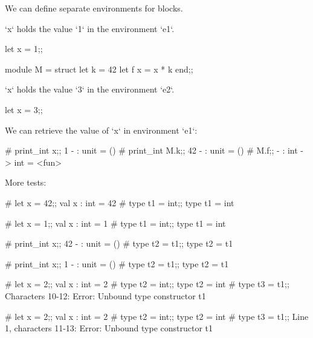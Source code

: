We can define separate environments for blocks.

`x` holds the value `1` in the environment `e1`.

\begin{ocaml}
let x = 1;;
\end{ocaml}

\begin{ocaml}
module M = struct let k = 42 let f x = x * k end;;
\end{ocaml}

`x` holds the value `3` in the environment `e2`.

\begin{ocaml}
let x = 3;;
\end{ocaml}

We can retrieve the value of `x` in environment `e1`:

\begin{ocaml}
# print_int x;;
1
- : unit = ()
# print_int M.k;;
42
- : unit = ()
# M.f;;
- : int -> int = <fun>
\end{ocaml}

More tests:
\begin{ocaml}
# let x = 42;;
val x : int = 42
# type t1 = int;;
type t1 = int
\end{ocaml}

\begin{ocaml}
# let x = 1;;
val x : int = 1
# type t1 = int;;
type t1 = int
\end{ocaml}

\begin{ocaml}
# print_int x;;
42
- : unit = ()
# type t2 = t1;;
type t2 = t1
\end{ocaml}

\begin{ocaml}
# print_int x;;
1
- : unit = ()
# type t2 = t1;;
type t2 = t1
\end{ocaml}

\begin{ocaml}
# let x = 2;;
val x : int = 2
# type t2 = int;;
type t2 = int
# type t3 = t1;;
Characters 10-12:
Error: Unbound type constructor t1
\end{ocaml}

\begin{ocaml}
# let x = 2;;
val x : int = 2
# type t2 = int;;
type t2 = int
# type t3 = t1;;
Line 1, characters 11-13:
Error: Unbound type constructor t1
\end{ocaml}

